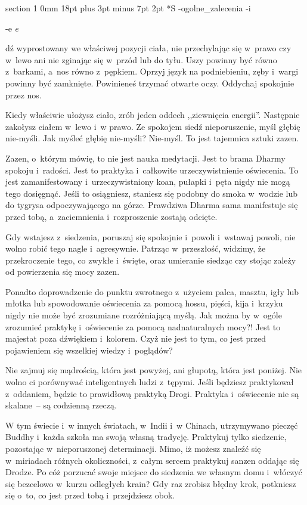 \documentclass[12pt]{article}
\makeatletter
\renewcommand{\section}{\@startsection%
 {section}			%
 {1}				%
 {0mm}				%
 {18pt plus 3pt minus 7pt}	%
 { 2pt}				%
 {\bfseries}}			%
\newcounter{labelnum}
\newenvironment{Prayer}[4]{%
	\section*{#2}
	\ifx -#1
		\stepcounter{labelnum}\label{label.\arabic{labelnum}}\nopagebreak
	\else
		\label{#1}\nopagebreak
	\fi
	\ifx -#3
		\addcontentsline{toc}{section}{#2}
	\else
		\addcontentsline{toc}{section}{#3}
	\fi
	\ifx -#4
		{}
	\else
		\noindent\emph{#4}\par\nopagebreak
	\fi
	\begingroup
}
{\par\endgroup}
\makeatother
\begin{document}
\begin{Prayer}{ogolne_zalecenia}
Siedź wyprostowany we właściwej pozycji ciała, nie przechylając się w~prawo
czy w~lewo ani nie zginając się w~przód lub do tyłu. Uszy powinny być równo
z~barkami, a~nos równo z~pępkiem. Oprzyj język na podniebieniu, zęby i~wargi
powinny być zamknięte. Powinieneś trzymać otwarte oczy. Oddychaj spokojnie
przez nos.


Kiedy właściwie ułożysz ciało, zrób jeden oddech ,,ziewnięcia energii''.
Następnie zakołysz ciałem w~lewo i~w prawo. Ze spokojem siedź nieporuszenie,
myśl głębię nie-myśli. Jak myśleć głębię nie-myśli? Nie-myśl. To jest
tajemnica sztuki zazen.


Zazen, o~którym mówię, to nie jest nauka medytacji. Jest to brama Dharmy
spokoju i~radości. Jest to praktyka i~całkowite urzeczywistnienie
oświecenia. To jest zamanifestowany i~urzeczywistniony koan, pułapki i~pęta
nigdy nie mogą tego dosięgnąć. Jeśli to osiągniesz, staniesz się podobny do
smoka w~wodzie lub do tygrysa odpoczywającego na górze. Prawdziwa Dharma
sama manifestuje się przed tobą, a~zaciemnienia i~rozproszenie zostają
odcięte.


Gdy wstajesz z~siedzenia, poruszaj się spokojnie i~powoli i~wstawaj powoli,
nie wolno robić tego nagle i~agresywnie. Patrząc w~przeszłość, widzimy, że
przekroczenie tego, co zwykłe i~święte, oraz umieranie siedząc czy stojąc
zależy od powierzenia się mocy zazen.


Ponadto doprowadzenie do punktu zwrotnego z~użyciem palca, masztu, igły lub
młotka lub spowodowanie oświecenia za pomocą hossu, pięści, kija i~krzyku
nigdy nie może być zrozumiane rozróżniającą myślą. Jak można by w~ogóle
zrozumieć praktykę i~oświecenie za pomocą nadnaturalnych mocy?! Jest to
majestat poza dźwiękiem i~kolorem. Czyż nie jest to tym, co jest przed
pojawieniem się wszelkiej wiedzy i~poglądów?


Nie zajmuj się mądrością, która jest powyżej, ani głupotą, która jest
poniżej. Nie wolno ci porównywać inteligentnych ludzi z~tępymi. Jeśli
będziesz praktykował z~oddaniem, będzie to prawidłową praktyką Drogi.
Praktyka i~oświecenie nie są skalane~-- są codzienną rzeczą.


W tym świecie i~w innych światach, w~Indii i~w Chinach, utrzymywano pieczęć
Buddhy i~każda szkoła ma swoją własną tradycję. Praktykuj tylko siedzenie,
pozostając w~nieporuszonej determinacji. Mimo, iż możesz znaleźć się
w~miriadach różnych okoliczności, z~całym sercem praktykuj sanzen oddając
się Drodze. Po cóż porzucać swoje miejsce do siedzenia we własnym domu
i~włóczyć się bezcelowo w~kurzu odległych krain? Gdy raz zrobisz błędny
krok, potkniesz się o~to, co jest przed tobą i~przejdziesz obok.



\end{Prayer}
\end{document}
